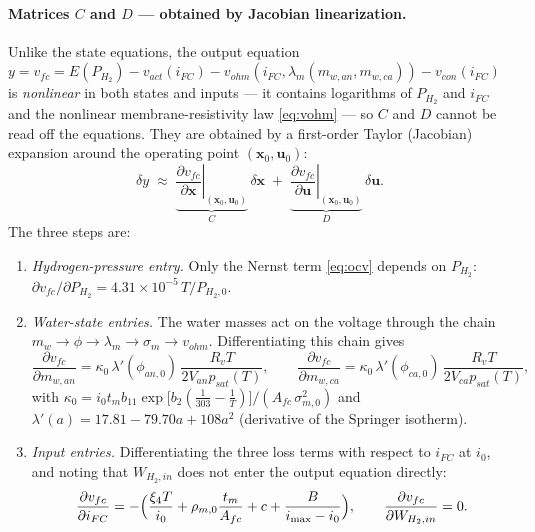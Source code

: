 \documentclass[11pt,a4paper]{article}
\begin{document}
\paragraph{Matrices $C$ and $D$ --- obtained by Jacobian linearization.}
Unlike the state equations, the output equation
$y = v_{fc} = E(P_{H_2}) - v_{act}(i_{FC}) - v_{ohm}(i_{FC},\lambda_m(m_{w,an},m_{w,ca})) - v_{con}(i_{FC})$
is \emph{nonlinear} in both states and inputs --- it contains logarithms of
$P_{H_2}$ and $i_{FC}$ and the nonlinear membrane-resistivity law
\eqref{eq:vohm} --- so $C$ and $D$ cannot be read off the equations. They are
obtained by a first-order Taylor (Jacobian) expansion around the operating point
$(\mathbf{x}_0,\mathbf{u}_0)$:
\begin{equation*}
    \delta y \;\approx\;
    \underbrace{\left.\frac{\partial v_{fc}}{\partial \mathbf{x}}\right|_{(\mathbf{x}_0,\mathbf{u}_0)}}_{C}\,
    \delta\mathbf{x}
    \;+\;
    \underbrace{\left.\frac{\partial v_{fc}}{\partial \mathbf{u}}\right|_{(\mathbf{x}_0,\mathbf{u}_0)}}_{D}\,
    \delta\mathbf{u}.
\end{equation*}
The three steps are:
\begin{enumerate}[itemsep=1pt]
    \item \emph{Hydrogen-pressure entry.} Only the Nernst term \eqref{eq:ocv}
          depends on $P_{H_2}$:
          $\partial v_{fc}/\partial P_{H_2}
           = 4.31\times10^{-5}\,T/P_{H_2,0}$.
    \item \emph{Water-state entries.} The water masses act on the voltage through
          the chain
          $m_{w}\rightarrow \phi \rightarrow \lambda_m \rightarrow \sigma_m
           \rightarrow v_{ohm}$. Differentiating this chain gives
          \begin{equation*}
              \frac{\partial v_{fc}}{\partial m_{w,an}}
              = \kappa_0\,\lambda'(\phi_{an,0})\,\frac{R_v T}{2V_{an}p_{sat}(T)},
              \qquad
              \frac{\partial v_{fc}}{\partial m_{w,ca}}
              = \kappa_0\,\lambda'(\phi_{ca,0})\,\frac{R_v T}{2V_{ca}p_{sat}(T)},
          \end{equation*}
          with
          $\kappa_0 = i_0 t_m b_{11}
           \exp\bigl[b_2(\tfrac{1}{303}-\tfrac{1}{T})\bigr]/(A_{fc}\,\sigma_{m,0}^{2})$
          and $\lambda'(a)=17.81-79.70a+108a^2$ (derivative of the Springer
          isotherm).
    \item \emph{Input entries.} Differentiating the three loss terms with respect
          to $i_{FC}$ at $i_0$, and noting that $W_{H_2,in}$ does not enter the
          output equation directly:
          \begin{equation*}
              \frac{\partial v_{fc}}{\partial i_{FC}}
              = -\Bigl(\frac{\xi_4 T}{i_0}
                + \rho_{m,0}\frac{t_m}{A_{fc}} + c
                + \frac{B}{i_{\max}-i_0}\Bigr),
              \qquad
              \frac{\partial v_{fc}}{\partial W_{H_2,in}} = 0.
          \end{equation*}
\end{enumerate}
\end{document}

